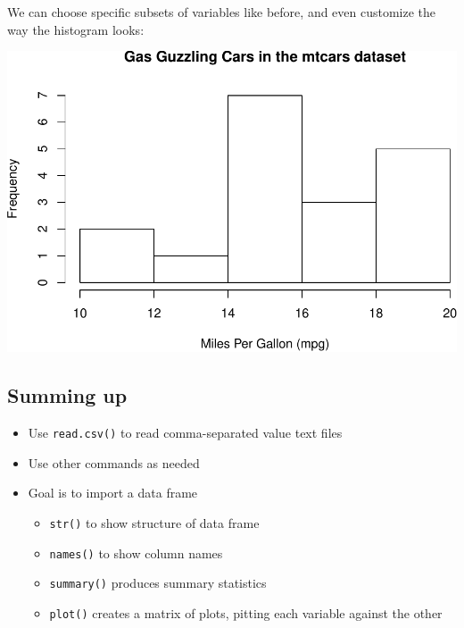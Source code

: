 \documentclass[]{article}
\newenvironment{Shaded}{\begin{snugshade}}{\end{snugshade}}
\newcommand{\KeywordTok}[1]{\textcolor[rgb]{0.13,0.29,0.53}{\textbf{#1}}}
\newcommand{\DataTypeTok}[1]{\textcolor[rgb]{0.13,0.29,0.53}{#1}}
\newcommand{\DecValTok}[1]{\textcolor[rgb]{0.00,0.00,0.81}{#1}}
\newcommand{\StringTok}[1]{\textcolor[rgb]{0.31,0.60,0.02}{#1}}
\newcommand{\OperatorTok}[1]{\textcolor[rgb]{0.81,0.36,0.00}{\textbf{#1}}}
\newcommand{\NormalTok}[1]{#1}
\providecommand{\tightlist}{%
  \setlength{\itemsep}{0pt}\setlength{\parskip}{0pt}}
\begin{document}
We can choose specific subsets of variables like before, and even
customize the way the histogram looks:

\begin{Shaded}
\end{Shaded}

\includegraphics{slow-r_files/figure-latex/unnamed-chunk-68-1.pdf}

\subsection{Summing up}\label{summing-up-3}

\begin{itemize}
\tightlist
\item
  Use \texttt{read.csv()} to read comma-separated value text files
\item
  Use other commands as needed
\item
  Goal is to import a data frame

  \begin{itemize}
  \tightlist
  \item
    \texttt{str()} to show structure of data frame
  \item
    \texttt{names()} to show column names
  \item
    \texttt{summary()} produces summary statistics
  \item
    \texttt{plot()} creates a matrix of plots, pitting each variable
    against the other
  \end{itemize}
\end{itemize}
\end{document}
